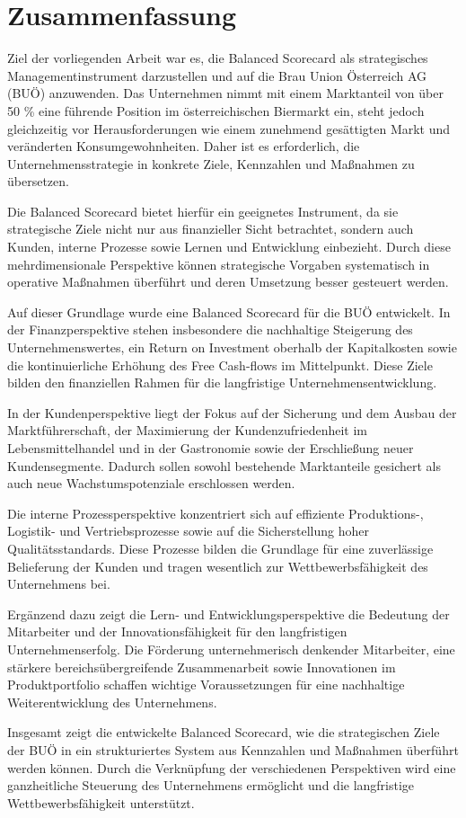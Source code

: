 \section{Zusammenfassung}

Ziel der vorliegenden Arbeit war es, die Balanced Scorecard als strategisches Managementinstrument darzustellen und auf die Brau Union Österreich AG (BUÖ) anzuwenden. Das Unternehmen nimmt mit einem Marktanteil von über 50 \% eine führende Position im österreichischen Biermarkt ein, steht jedoch gleichzeitig vor Herausforderungen wie einem zunehmend gesättigten Markt und veränderten Konsumgewohnheiten. Daher ist es erforderlich, die Unternehmensstrategie in konkrete Ziele, Kennzahlen und Maßnahmen zu übersetzen.

Die Balanced Scorecard bietet hierfür ein geeignetes Instrument, da sie strategische Ziele nicht nur aus finanzieller Sicht betrachtet, sondern auch Kunden, interne Prozesse sowie Lernen und Entwicklung einbezieht. Durch diese mehrdimensionale Perspektive können strategische Vorgaben systematisch in operative Maßnahmen überführt und deren Umsetzung besser gesteuert werden.

Auf dieser Grundlage wurde eine Balanced Scorecard für die BUÖ entwickelt. In der Finanzperspektive stehen insbesondere die nachhaltige Steigerung des Unternehmenswertes, ein Return on Investment oberhalb der Kapitalkosten sowie die kontinuierliche Erhöhung des Free Cash-flows im Mittelpunkt. Diese Ziele bilden den finanziellen Rahmen für die langfristige Unternehmensentwicklung.

In der Kundenperspektive liegt der Fokus auf der Sicherung und dem Ausbau der Marktführerschaft, der Maximierung der Kundenzufriedenheit im Lebensmittelhandel und in der Gastronomie sowie der Erschließung neuer Kundensegmente. Dadurch sollen sowohl bestehende Marktanteile gesichert als auch neue Wachstumspotenziale erschlossen werden.

Die interne Prozessperspektive konzentriert sich auf effiziente Produktions-, Logistik- und Vertriebsprozesse sowie auf die Sicherstellung hoher Qualitätsstandards. Diese Prozesse bilden die Grundlage für eine zuverlässige Belieferung der Kunden und tragen wesentlich zur Wettbewerbsfähigkeit des Unternehmens bei.

Ergänzend dazu zeigt die Lern- und Entwicklungsperspektive die Bedeutung der Mitarbeiter und der Innovationsfähigkeit für den langfristigen Unternehmenserfolg. Die Förderung unternehmerisch denkender Mitarbeiter, eine stärkere bereichsübergreifende Zusammenarbeit sowie Innovationen im Produktportfolio schaffen wichtige Voraussetzungen für eine nachhaltige Weiterentwicklung des Unternehmens.

Insgesamt zeigt die entwickelte Balanced Scorecard, wie die strategischen Ziele der BUÖ in ein strukturiertes System aus Kennzahlen und Maßnahmen überführt werden können. Durch die Verknüpfung der verschiedenen Perspektiven wird eine ganzheitliche Steuerung des Unternehmens ermöglicht und die langfristige Wettbewerbsfähigkeit unterstützt.